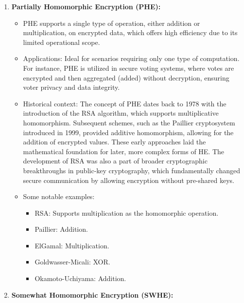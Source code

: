 \documentclass[
  letterpaper,
  DIV=11,
  numbers=noendperiod,
  oneside]{scrartcl}
\providecommand{\tightlist}{%
  \setlength{\itemsep}{0pt}\setlength{\parskip}{0pt}}\usepackage{longtable,booktabs,array}
\begin{document}
\begin{enumerate}
\def\labelenumi{\arabic{enumi}.}
\item
  \textbf{Partially Homomorphic Encryption (PHE):}

  \begin{itemize}
  \item
    PHE supports a single type of operation, either addition or
    multiplication, on encrypted data, which offers high efficiency due
    to its limited operational scope.
  \item
    Applications: Ideal for scenarios requiring only one type of
    computation. For instance, PHE is utilized in secure voting systems,
    where votes are encrypted and then aggregated (added) without
    decryption, ensuring voter privacy and data integrity.
  \item
    Historical context: The concept of PHE dates back to 1978 with the
    introduction of the RSA algorithm, which supports multiplicative
    homomorphism. Subsequent schemes, such as the Paillier cryptosystem
    introduced in 1999, provided additive homomorphism, allowing for the
    addition of encrypted values. These early approaches laid the
    mathematical foundation for later, more complex forms of HE. The
    development of RSA was also a part of broader cryptographic
    breakthroughs in public-key cryptography, which fundamentally
    changed secure communication by allowing encryption without
    pre-shared keys.
  \item
    Some notable examples:

    \begin{itemize}
    \tightlist
    \item
      RSA: Supports multiplication as the homomorphic operation.
    \item
      Paillier: Addition.
    \item
      ElGamal: Multiplication.
    \item
      Goldwasser-Micali: XOR.
    \item
      Okamoto-Uchiyama: Addition.
    \end{itemize}
  \end{itemize}
\item
  \textbf{Somewhat Homomorphic Encryption (SWHE):}


\end{enumerate}
\end{document}
